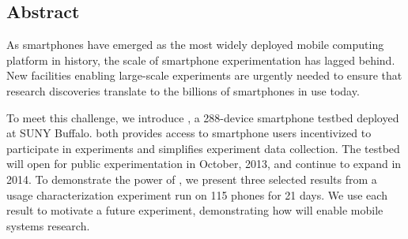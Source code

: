 \subsection*{Abstract}

As smartphones have emerged as the most widely deployed mobile computing
platform in history, the scale of smartphone experimentation has lagged
behind. New facilities enabling large-scale experiments are urgently needed
to ensure that research discoveries translate to the billions of smartphones
in use today.

To meet this challenge, we introduce \PhoneLab{}, a 288-device smartphone
testbed deployed at SUNY Buffalo. \PhoneLab{} both provides access to
smartphone users incentivized to participate in experiments and simplifies
experiment data collection. The testbed will open for public experimentation
in October, 2013, and continue to expand in 2014. To demonstrate the power of
\PhoneLab{}, we present three selected results from a usage characterization
experiment run on 115 phones for 21 days. We use each result to motivate a
future \PhoneLab{} experiment, demonstrating how \PhoneLab{} will enable
mobile systems research.
